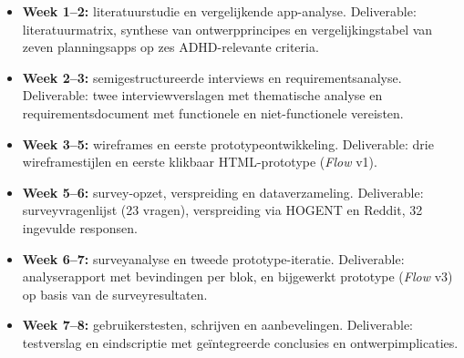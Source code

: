 \begin{itemize}
  \item \textbf{Week 1--2:} literatuurstudie en vergelijkende app-analyse.
  Deliverable: literatuurmatrix, synthese van ontwerpprincipes en
  vergelijkingstabel van zeven planningsapps op zes ADHD-relevante criteria.

  \item \textbf{Week 2--3:} semigestructureerde interviews en
  requirementsanalyse.
  Deliverable: twee interviewverslagen met thematische analyse en
  requirementsdocument met functionele en niet-functionele vereisten.

  \item \textbf{Week 3--5:} wireframes en eerste prototypeontwikkeling.
  Deliverable: drie wireframestijlen en eerste klikbaar HTML-prototype
  (\textit{Flow} v1).

  \item \textbf{Week 5--6:} survey-opzet, verspreiding en dataverzameling.
  Deliverable: surveyvragenlijst (23 vragen), verspreiding via HOGENT en
  Reddit, 32 ingevulde responsen.

  \item \textbf{Week 6--7:} surveyanalyse en tweede prototype-iteratie.
  Deliverable: analyserapport met bevindingen per blok, en bijgewerkt
  prototype (\textit{Flow} v3) op basis van de surveyresultaten.

  \item \textbf{Week 7--8:} gebruikerstesten, schrijven en aanbevelingen.
  Deliverable: testverslag en eindscriptie met geïntegreerde conclusies
  en ontwerpimplicaties.
\end{itemize}